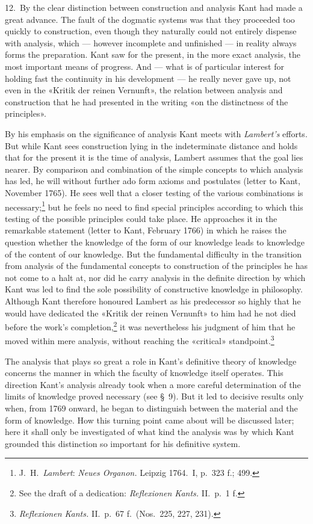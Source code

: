 \documentclass[12pt,a4paper]{article}
\newcommand{\opage}[1]{\marginnote{\footnotesize\textit{[#1]}}}
\begin{document}
12.\ By the clear distinction between construction and analysis Kant had
made a great advance. The fault of the dogmatic systems was that they
proceeded too quickly to construction, even though they naturally could
not entirely dispense with analysis, which --- however incomplete and
unfinished --- in reality always forms the preparation. Kant saw for the
present, in the more exact analysis, the most important means of progress.
And --- what is of particular interest for holding fast the continuity in
his development --- he really never gave up, not even in the «Kritik der
reinen Vernunft», the relation between analysis and construction that he
had presented in the writing «on the distinctness of the principles».

By his emphasis on the significance of analysis Kant meets with \emph{Lambert's}
efforts. But while Kant sees construction lying in the indeterminate
distance and holds that for the present it is the time of analysis, Lambert
assumes that the goal lies nearer. By comparison and combination of the
simple concepts to which analysis has led, he will without further ado form
axioms and postulates (letter to Kant, November 1765). He sees well that a
closer testing of the various combinations is necessary;\footnote{J.\ H.\
\emph{Lambert}: \textit{Neues Organon.} Leipzig 1764.\ I, p.\ 323 f.; 499.} but he
feels no need to find special principles according to which this testing of
the possible principles could take place. He approaches it in the
remarkable statement (letter to \opage{26}Kant, February 1766) in which he raises the
question whether the knowledge of the form of our knowledge leads to
knowledge of the content of our knowledge. But the fundamental difficulty
in the transition from analysis of the fundamental concepts to construction
of the principles he has not come to a halt at, nor did he carry analysis
in the definite direction by which Kant was led to find the sole
possibility of constructive knowledge in philosophy. Although Kant
therefore honoured Lambert as his predecessor so highly that he would have
dedicated the «Kritik der reinen Vernunft» to him had he not died before
the work's completion,\footnote{See the draft of a dedication:
\textit{Reflexionen Kants.} II.\ p.\ 1 f.} it was nevertheless his
judgment of him that he moved within mere analysis, without reaching the
«critical» standpoint.\footnote{\textit{Reflexionen Kants.} II.\ p.\ 67 f.\
(Nos.\ 225, 227, 231).}

The analysis that plays so great a role in Kant's definitive theory of
knowledge concerns the manner in which the faculty of knowledge itself
operates. This direction Kant's analysis already took when a more careful
determination of the limits of knowledge proved necessary (see §\ 9). But
it led to decisive results only when, from 1769 onward, he began to
distinguish between the material and the form of knowledge. How this
turning point came about will be discussed later; here it shall only be
investigated of what kind the analysis was by which Kant grounded this
distinction so important for his definitive system.
\end{document}
